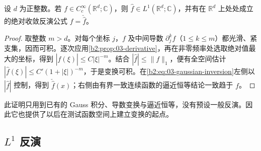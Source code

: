 \begin{proposition}\label{b2:prop:03-smooth-inversion}
设 \(d\) 为正整数。若 \(f\in C_c^\infty(\mathbb R^d;\mathbb C)\)，则 \(\widehat f\in L^1(\mathbb R^d;\mathbb C)\)，并有在 \(\mathbb R^d\) 上处处成立的绝对收敛反演公式 \(f=\check {\widehat f}\)。
\end{proposition}
\begin{proof}
取整数 \(m>d\)。对每个坐标 \(j\)，\(f\) 及中间导数 \(\partial_j^k f\)（\(1\leq k\leq m\)）都光滑、紧支集，因而可积。逐次应用\cref{b2:prop:03-derivative}，再在非零频率处选取绝对值最大的坐标，得到 \(|\widehat f(\xi)|\leq C|\xi|^{-m}\)。结合 \(|\widehat f|\leq\|f\|_1\)，便有全空间估计 \(|\widehat f(\xi)|\leq C'(1+|\xi|)^{-m}\)，于是变换可积。在\eqref{b2:eq:03-gaussian-inversion}左侧以 \(|\widehat f|\) 控制，得到 \(\check {\widehat f}(x)\)；右侧由有界一致连续函数的逼近恒等结论一致趋于 \(f\)。
\end{proof}

此证明只用到已有的 Gauss 积分、导数变换与逼近恒等，没有预设一般反演。因此它也提供了以后在测试函数空间上建立变换的起点。

\subsection{\texorpdfstring{\(L^1\)}{L¹} 反演}
\label{b2:subsec:030502}

